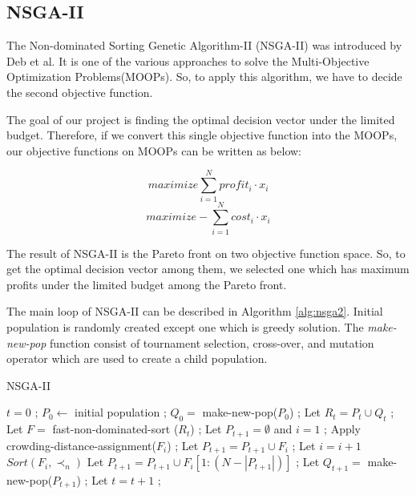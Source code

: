 \subsection{NSGA-II}
The Non-dominated Sorting Genetic Algorithm-II (NSGA-II) was introduced by Deb et al.\cite{NSGA2} It is one of the various approaches to solve the Multi-Objective Optimization Problems(MOOPs). So, to apply this algorithm, we have to decide the second objective function. 

The goal of our project is finding the optimal decision vector under the limited budget. Therefore, if we convert this single objective function into the MOOPs, our objective functions on MOOPs can be written as below:

\[
maximize \sum_{i = 1}^{N} profit_i \cdot x_i
\]
\[
maximize -\sum_{i = 1}^{N} cost_i \cdot x_i
\]

The result of NSGA-II is the Pareto front on two objective function space. So, to get the optimal decision vector among them, we selected one which has maximum profits under the limited budget among the Pareto front.

The main loop of NSGA-II can be described in Algorithm \ref{alg:nsga2}. Initial population is randomly created except one which is greedy solution. The \textit{make-new-pop} function consist of tournament selection, cross-over, and mutation operator which are used to create a child population.

\begin{algorithm}
\caption{NSGA-II}\label{alg:nsga2}
\begin{algorithmic}
    \State $t = 0$ ;
    \State $P_0 \gets$ initial population ;
    \State $Q_0 =$ make-new-pop($P_0$) ;
        \State Let $R_t = P_t \cup Q_t$ ;
        \State Let $F = $ fast-non-dominated-sort ($R_t$) ; %
        \State Let $P_{t+1} = \emptyset$ and $i = 1$ ;
            \State Apply crowding-distance-assignment($F_i$) ; %
            \State Let $P_{t+1} = P_{t+1} \cup F_i$ ;
            \State Let $i = i + 1$
        \EndWhile
        \State $Sort(F_i, \prec_n)$
        \State Let $P_{t+1} = P_{t+1} \cup F_i[1:(N - |P_{t+1}|)]$ ;
        \State Let $Q_{t+1} = $ make-new-pop($P_{t+1}$) ;
        \State Let $t = t + 1$ ;
    \EndWhile
\end{algorithmic}
\end{algorithm}

